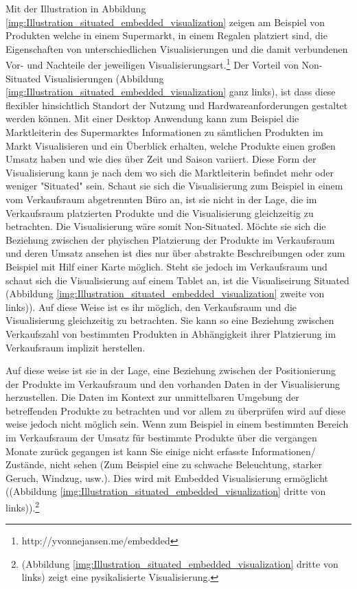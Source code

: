 Mit der Illustration in Abbildung \ref{img:Illustration_situated_embedded_visualization} zeigen \cite{WesleyWillettYvonneJansen} am Beispiel von Produkten welche in einem Supermarkt, 
in einem Regalen platziert sind, die Eigenschaften von unterschiedlichen Visualisierungen und die damit verbundenen Vor- und Nachteile der jeweiligen Visualisierungsart.\footnote{http://yvonnejansen.me/embedded} Der Vorteil von Non-Situated Visualisierungen (Abbildung \ref{img:Illustration_situated_embedded_visualization} ganz links), ist dass diese flexibler hinsichtlich Standort der Nutzung und Hardwareanforderungen gestaltet werden können. Mit einer Desktop Anwendung kann zum Beispiel die Marktleiterin des Supermarktes Informationen zu sämtlichen Produkten im Markt Visualisieren und ein Überblick erhalten, welche Produkte einen großen Umsatz haben und wie dies über Zeit und Saison variiert. Diese Form der Visualisierung kann je nach dem wo sich die Marktleiterin befindet mehr oder weniger "Situated" sein. Schaut sie sich die Visualisierung zum Beispiel in einem vom Verkaufsraum abgetrennten Büro an, ist sie nicht in der Lage, die im Verkaufsraum platzierten Produkte und die Visualisierung gleichzeitig zu betrachten. Die Visualisierung wäre somit Non-Situated. Möchte sie sich die Beziehung zwischen der phyischen Platzierung der Produkte im Verkaufsraum und deren Umsatz ansehen ist dies nur über abstrakte Beschreibungen oder zum Beispiel mit Hilf einer Karte möglich. Steht sie jedoch im Verkaufsraum und schaut sich die Visualisierung auf einem Tablet an, ist die Visualiseirung Situated (Abbildung \ref{img:Illustration_situated_embedded_visualization} zweite von links)). Auf diese Weise ist es ihr möglich, den Verkaufsraum und die Visualisierung gleichzeitig zu betrachten. Sie kann so eine Beziehung zwischen Verkaufszahl von bestimmten Produkten in Abhängigkeit ihrer Platzierung im Verkaufsraum implizit herstellen.

Auf diese weise ist sie in der Lage, eine Beziehung zwischen der Positionierung der Produkte im Verkaufsraum und den vorhanden Daten in der Visualisierung herzustellen. Die Daten im Kontext zur unmittelbaren Umgebung 
der betreffenden Produkte zu betrachten und vor allem zu überprüfen wird auf diese weise jedoch nicht möglich sein. Wenn zum Beispiel in einem bestimmten Bereich im Verkaufsraum der Umsatz für bestimmte Produkte 
über die vergangen Monate zurück gegangen ist kann Sie einige nicht erfasste Informationen/ Zustände, nicht sehen (Zum Beispiel eine zu schwache Beleuchtung, starker Geruch, Windzug, usw.). Dies wird mit Embedded 
Visualisierung ermöglicht ((Abbildung \ref{img:Illustration_situated_embedded_visualization} dritte von links)).\footnote{(Abbildung \ref{img:Illustration_situated_embedded_visualization} dritte von links) zeigt eine pysikalisierte Visualisierung.}   

